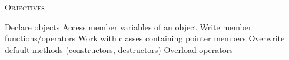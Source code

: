 \textsc{Objectives}
    \begin{enumerate}[nosep]
    \li Declare objects
    \li Access member variables of an object
    \li Write member functions/operators
    \li Work with classes containing pointer members
    \li Overwrite default methods (constructors, destructors)
    \li Overload operators
    \end{enumerate}

